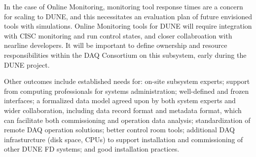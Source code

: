 In the case of Online Monitoring, monitoring tool response times are a
concern for scaling to DUNE, and this necessitates an evaluation plan
of future envisioned tools with simulations. Online Monitoring tools
for DUNE will require integration with CISC monitoring and run control
states,  and closer collabroation with nearline developers. It will be
important to define ownership and resource responsibilities within the
DAQ Consortium on this
subsystem, early during the DUNE project.

Other outcomes include established needs for: on-site
subsystem experts; support from computing professionals
for systems administration; well-defined and frozen interfaces;
a formalized data model agreed upon by both system experts and wider
collaboration, including data record format and metadata format, which can facilitate both commissioning and operation
data analysis; standardization of remote DAQ operation solutions;
better control room tools; additional DAQ infrasturcture (disk
space, CPUs) to support installation and commissioning of other DUNE
FD systems; and good
installation practices.






